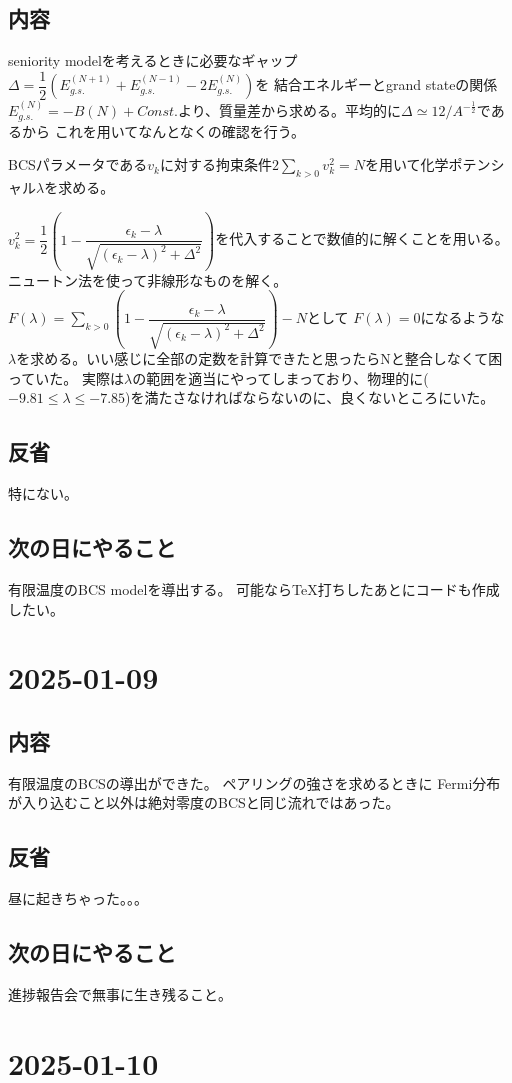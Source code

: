 \documentclass[a4paper,12pt]{jsreport}
\begin{document}
\subsection*{内容}
seniority modelを考えるときに必要なギャップ$\Delta=\dfrac{1}{2}(E_{g.s.}^{(N+1)}+E_{g.s.}^{(N-1)}-2E_{g.s.}^{(N)})$を
結合エネルギーとgrand stateの関係$E_{g.s.}^{(N)}=-B(N)+Const.$より、質量差から求める。平均的に$\Delta\simeq12/A^{-\frac{1}{2}}$であるから
これを用いてなんとなくの確認を行う。\par
BCSパラメータである$v_k$に対する拘束条件$2\sum_{k>0} v^2_k=N$を用いて化学ポテンシャル$\lambda$を求める。\par
$v^2_k=\dfrac{1}{2}\left(1-\dfrac{\epsilon_k-\lambda}{\sqrt{(\epsilon_k-\lambda)^2+\Delta^2}}\right)$を代入することで数値的に解くことを用いる。
ニュートン法を使って非線形なものを解く。$F(\lambda)=\sum_{k>0}\left(1-\dfrac{\epsilon_k-\lambda}{\sqrt{(\epsilon_k-\lambda)^2+\Delta^2}}\right)-N$として
$F(\lambda)=0$になるような$\lambda$を求める。いい感じに全部の定数を計算できたと思ったらNと整合しなくて困っていた。
実際は$\lambda$の範囲を適当にやってしまっており、物理的に($-9.81\leq \lambda \leq -7.85 $)を満たさなければならないのに、良くないところにいた。
\subsection*{反省}
特にない。
\subsection*{次の日にやること}
有限温度のBCS modelを導出する。
可能ならTeX打ちしたあとにコードも作成したい。
\section*{2025-01-09}
\subsection*{内容}
有限温度のBCSの導出ができた。
ペアリングの強さを求めるときに
Fermi分布が入り込むこと以外は絶対零度のBCSと同じ流れではあった。
\subsection*{反省}
昼に起きちゃった。。。
\subsection*{次の日にやること}
進捗報告会で無事に生き残ること。
\section*{2025-01-10}
\end{document}
